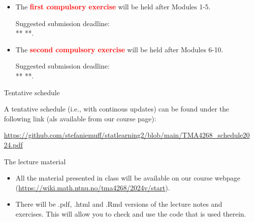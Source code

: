 \documentclass[
  10pt,
  ignorenonframetext,
]{beamer}
\providecommand{\tightlist}{%
  \setlength{\itemsep}{0pt}\setlength{\parskip}{0pt}}
\begin{document}
\begin{frame}
\begin{itemize}
\item
  The \textbf{\textcolor{red}{first compulsory exercise}} will be held
  after Modules 1-5.

  \hspace{8mm}

  Suggested submission deadline:\\
  \vspace{2mm} \hspace{8mm} ** **.
\end{itemize}

\vspace{8mm}

\begin{itemize}
\item
  The \textbf{\textcolor{red}{second compulsory exercise}} will be held
  after Modules 6-10.

  \hspace{8mm}

  Suggested submission deadline:\\
  \vspace{2mm} \hspace{8mm}** **.
\end{itemize}
\end{frame}

\begin{frame}
\begin{block}{Tentative schedule}
\protect\hypertarget{tentative-schedule}{}
\(~\)

A tentative schedule (i.e., with continous updates) can be found under
the following link (als available from our course page):

\vspace{2mm}

\url{https://github.com/stefaniemuff/statlearning2/blob/main/TMA4268_schedule2024.pdf}
\end{block}
\end{frame}

\begin{frame}
\begin{block}{The lecture material}
\protect\hypertarget{the-lecture-material}{}
\(~\)

\begin{itemize}
\tightlist
\item
  All the material presented in class will be available on our course
  webpage (\url{https://wiki.math.ntnu.no/tma4268/2024v/start}).
\end{itemize}

\vspace{2mm}

\begin{itemize}
\tightlist
\item
  There will be .pdf, .html and .Rmd versions of the lecture notes and
  exercises. This will allow you to check and use the code that is used
  therein.
\end{itemize}
\end{block}
\end{frame}
\end{document}
